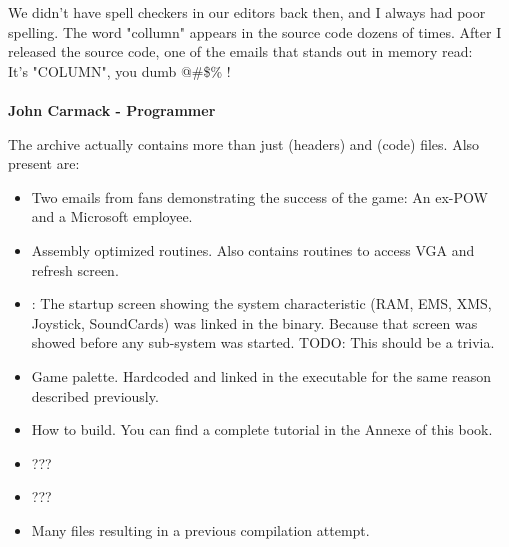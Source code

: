 \documentclass[book.tex]{subfiles}
\begin{document}
 \begin{fancyquotes}
   We didn't have spell checkers in our editors back then, and I always had poor spelling.  The word "collumn" appears in the source code dozens of times.  After I released the source code, one of the emails that stands out in memory read:
 \bigskip \\
It's "COLUMN", you dumb @\#\$\% !\\
 \bigskip \\
\textbf{John Carmack - Programmer}
 \end{fancyquotes}
 
The archive actually contains more than just  (headers) and  (code) files. Also present are:
\begin{itemize}
\item {} Two emails from fans demonstrating the success of the game: An ex-POW and a Microsoft employee.
\item {} Assembly optimized routines. Also contains  routines to access VGA and refresh screen.
\item {}: The startup screen showing the system characteristic (RAM, EMS, XMS, Joystick, SoundCards) was linked in the binary. Because that screen was showed before any sub-system was started. TODO: This should be a trivia.
\item {} Game palette. Hardcoded and linked in the executable for the same reason described previously.
\item {} How to build. You can find a complete tutorial in the Annexe of this book.
\item {} ???
\item {} ???
\item Many files resulting in a previous compilation attempt.
\end{itemize}
\end{document}
